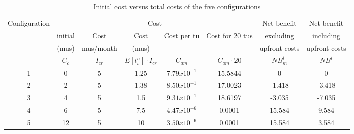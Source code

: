 \begin{table}[h]
\caption{ Initial cost versus total costs of the five configurations}
\begin{tabular}{|l|l|l|l|l|l|l|l|}
\hline
\multicolumn{1}{|c|}{Configuration} & \multicolumn{5}{c|}{Cost} & \multicolumn{1}{c|}{Net benefit} & \multicolumn{1}{c|}{Net benefit} \\ 
\cline{2-6}
\multicolumn{1}{|c|}{} & \multicolumn{1}{c|}{initial} & \multicolumn{1}{c|}{ Cost} & \multicolumn{1}{c|}{Cost} & \multicolumn{1}{c|}{Cost per tu} & \multicolumn{1}{c|}{Cost for 20 tus} & \multicolumn{1}{c|}{excluding} & \multicolumn{1}{c|}{including} \\ 
\multicolumn{1}{|c|}{} & \multicolumn{1}{c|}{(mus)} & \multicolumn{1}{c|}{mus/month} & \multicolumn{1}{c|}{(mus)} & \multicolumn{1}{c|}{} & \multicolumn{1}{c|}{} & \multicolumn{1}{c|}{upfront costs} & \multicolumn{1}{c|}{upfront costs} \\ 
\multicolumn{1}{|c|}{} & \multicolumn{1}{c|}{$C_c$} & \multicolumn{1}{c|}{$I_{cr}$} & \multicolumn{1}{c|}{$E[t_i^n]\cdot I_{cr}$} & \multicolumn{1}{c|}{$C_{am}$} & \multicolumn{1}{c|}{$C_{am}\cdot 20$} & \multicolumn{1}{c|}{$NB_m^i$} & \multicolumn{1}{c|}{$NB^i$} \\ 
\hline
\multicolumn{1}{|c|}{1} & \multicolumn{1}{c|}{0} & \multicolumn{1}{c|}{5} & \multicolumn{1}{c|}{1.25} & \multicolumn{1}{c|}{$7.79x10^{-1}$} & \multicolumn{1}{c|}{15.5844} & \multicolumn{1}{c|}{0} & \multicolumn{1}{c|}{0} \\ 
\hline
\multicolumn{1}{|c|}{2} & \multicolumn{1}{c|}{2} & \multicolumn{1}{c|}{5} & \multicolumn{1}{c|}{1.38} & \multicolumn{1}{c|}{$8.50x10^{-1}$} & \multicolumn{1}{c|}{17.0023} & \multicolumn{1}{c|}{-1.418} & \multicolumn{1}{c|}{-3.418} \\ 
\hline
\multicolumn{1}{|c|}{3} & \multicolumn{1}{c|}{4} & \multicolumn{1}{c|}{5} & \multicolumn{1}{c|}{1.5} & \multicolumn{1}{c|}{$9.31x10^{-1}$} & \multicolumn{1}{c|}{18.6197} & \multicolumn{1}{c|}{-3.035} & \multicolumn{1}{c|}{-7.035} \\ 
\hline
\multicolumn{1}{|c|}{4} & \multicolumn{1}{c|}{6} & \multicolumn{1}{c|}{5} & \multicolumn{1}{c|}{7.5} & \multicolumn{1}{c|}{$4.47x10^{-6}$} & \multicolumn{1}{c|}{0.0001} & \multicolumn{1}{c|}{15.584} & \multicolumn{1}{c|}{9.584} \\ 
\hline
\multicolumn{1}{|c|}{5} & \multicolumn{1}{c|}{12} & \multicolumn{1}{c|}{5} & \multicolumn{1}{c|}{10} & \multicolumn{1}{c|}{$3.50x10^{-6}$} & \multicolumn{1}{c|}{0.0001} & \multicolumn{1}{c|}{15.584} & \multicolumn{1}{c|}{3.584} \\ 
\hline
\end{tabular}
\label{tblavaimain:6}
\end{table}

